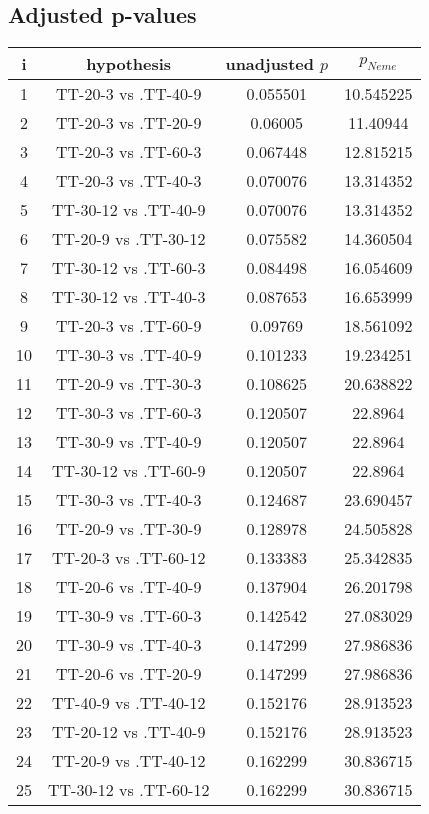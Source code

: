\documentclass[a4paper,10pt]{article}
\begin{document}
\begin{landscape}
\pagebreak

\subsection{Adjusted p-values}

\begin{table}[!htp]
\centering\scriptsize
\begin{tabular}{cccc}
i&hypothesis&unadjusted $p$&$p_{Neme}$\\
\hline1&TT-20-3 vs .TT-40-9&0.055501&10.545225\\
2&TT-20-3 vs .TT-20-9&0.06005&11.40944\\
3&TT-20-3 vs .TT-60-3&0.067448&12.815215\\
4&TT-20-3 vs .TT-40-3&0.070076&13.314352\\
5&TT-30-12 vs .TT-40-9&0.070076&13.314352\\
6&TT-20-9 vs .TT-30-12&0.075582&14.360504\\
7&TT-30-12 vs .TT-60-3&0.084498&16.054609\\
8&TT-30-12 vs .TT-40-3&0.087653&16.653999\\
9&TT-20-3 vs .TT-60-9&0.09769&18.561092\\
10&TT-30-3 vs .TT-40-9&0.101233&19.234251\\
11&TT-20-9 vs .TT-30-3&0.108625&20.638822\\
12&TT-30-3 vs .TT-60-3&0.120507&22.8964\\
13&TT-30-9 vs .TT-40-9&0.120507&22.8964\\
14&TT-30-12 vs .TT-60-9&0.120507&22.8964\\
15&TT-30-3 vs .TT-40-3&0.124687&23.690457\\
16&TT-20-9 vs .TT-30-9&0.128978&24.505828\\
17&TT-20-3 vs .TT-60-12&0.133383&25.342835\\
18&TT-20-6 vs .TT-40-9&0.137904&26.201798\\
19&TT-30-9 vs .TT-60-3&0.142542&27.083029\\
20&TT-30-9 vs .TT-40-3&0.147299&27.986836\\
21&TT-20-6 vs .TT-20-9&0.147299&27.986836\\
22&TT-40-9 vs .TT-40-12&0.152176&28.913523\\
23&TT-20-12 vs .TT-40-9&0.152176&28.913523\\
24&TT-20-9 vs .TT-40-12&0.162299&30.836715\\
25&TT-30-12 vs .TT-60-12&0.162299&30.836715\\

\end{tabular}
\end{table}
\end{landscape}
\end{document}
